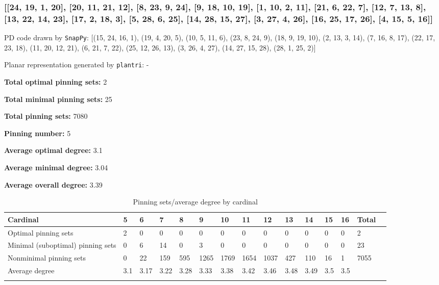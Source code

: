 \documentclass{article}%
\begin{document}
\newpage

\subsubsection{[[24, 19, 1, 20], [20, 11, 21, 12], [8, 23, 9, 24], [9, 18, 10, 19], [1, 10, 2, 11], [21, 6, 22, 7], [12, 7, 13, 8], [13, 22, 14, 23], [17, 2, 18, 3], [5, 28, 6, 25], [14, 28, 15, 27], [3, 27, 4, 26], [16, 25, 17, 26], [4, 15, 5, 16]]}

{\small\noindent PD code drawn by \texttt{SnapPy}: [(15, 24, 16, 1), (19, 4, 20, 5), (10, 5, 11, 6), (23, 8, 24, 9), (18, 9, 19, 10), (2, 13, 3, 14), (7, 16, 8, 17), (22, 17, 23, 18), (11, 20, 12, 21), (6, 21, 7, 22), (25, 12, 26, 13), (3, 26, 4, 27), (14, 27, 15, 28), (28, 1, 25, 2)]}

{\small\noindent Planar representation generated by \texttt{plantri}: -}

\begin{multicols}{2}
{\normalsize \noindent\textbf{Total optimal pinning sets:} 2

\noindent\textbf{Total minimal pinning sets:} 25

\noindent\textbf{Total pinning sets:} 7080

\noindent\textbf{Pinning number:} 5

}
\columnbreak

{\normalsize \noindent\textbf{Average optimal degree:} 3.1

\noindent\textbf{Average minimal degree:} 3.04

\noindent\textbf{Average overall degree:} 3.39

}
\end{multicols}

\begin{table}[ht]
	\caption{Pinning sets/average degree by cardinal}
	\centering
	\renewcommand{\arraystretch}{1.5}
	\begin{tabularx}{\textwidth}{lXXXXXXXXXXXXXX}
		\toprule
			Cardinal & 5 & 6 & 7 & 8 & 9 & 10 & 11 & 12 & 13 & 14 & 15 & 16 & Total\\
			\hline
			Optimal pinning sets & 2 & 0 & 0 & 0 & 0 & 0 & 0 & 0 & 0 & 0 & 0 & 0 & 2 \\
			Minimal (suboptimal) pinning sets & 0 & 6 & 14 & 0 & 3 & 0 & 0 & 0 & 0 & 0 & 0 & 0 & 23 \\
			Nonminimal pinning sets & 0 & 22 & 159 & 595 & 1265 & 1769 & 1654 & 1037 & 427 & 110 & 16 & 1 & 7055 \\
			Average degree & 3.1 & 3.17 & 3.22 & 3.28 & 3.33 & 3.38 & 3.42 & 3.46 & 3.48 & 3.49 & 3.5 & 3.5 &  \\
		\bottomrule \\ 
	\end{tabularx}
\end{table}
\end{document}
